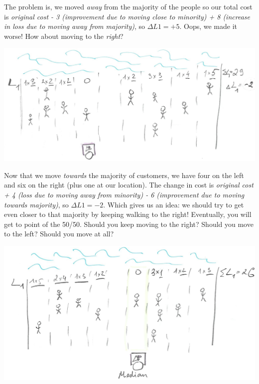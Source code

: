 \documentclass[
]{book}
\begin{document}
The problem is, we moved \emph{away} from the majority of the people so our total cost is \emph{original cost - 3 (improvement due to moving close to minority) + 8 (increase in loss due to moving away from majority)}, so \(\Delta L1 = +5\). Oops, we made it worse! How about moving to the \emph{right}?

\begin{center}\includegraphics[width=1\linewidth]{images/loss-functions-L1-right} \end{center}

Now that we move \emph{towards} the majority of customers, we have four on the left and six on the right (plus one at our location). The change in cost is \emph{original cost + 4 (loss due to moving away from minority) - 6 (improvement due to moving towards majority)}, so \(\Delta L1 = -2\). Which gives us an idea: we should try to get even closer to that majority by keeping walking to the right! Eventually, you will get to point of the 50/50. Should you keep moving to the right? Should you move to the left? Should you move at all?

\begin{center}\includegraphics[width=1\linewidth]{images/loss-functions-L1-median} \end{center}
\end{document}
